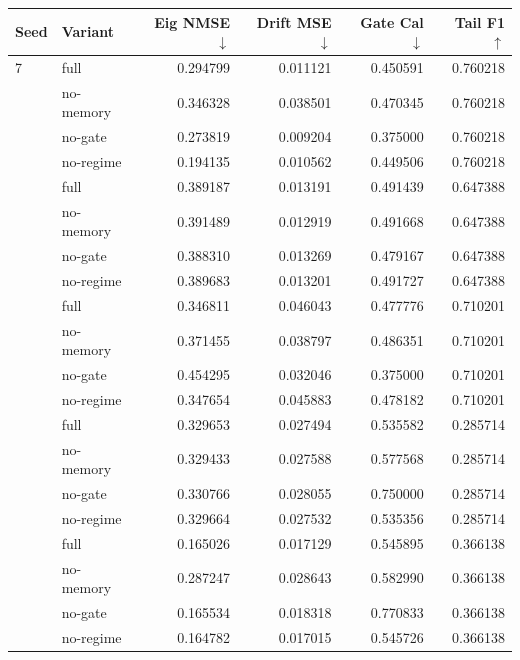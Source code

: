 \begin{tabular}{llrrrr}
\toprule
Seed & Variant & Eig NMSE $\downarrow$ & Drift MSE $\downarrow$ & Gate Cal $\downarrow$ & Tail F1 $\uparrow$ \\
\midrule
7 & full & 0.294799 & 0.011121 & 0.450591 & 0.760218 \\
 & no-memory & 0.346328 & 0.038501 & 0.470345 & 0.760218 \\
 & no-gate & 0.273819 & 0.009204 & 0.375000 & 0.760218 \\
 & no-regime & 0.194135 & 0.010562 & 0.449506 & 0.760218 \\
\addlinespace[2pt]
19 & full & 0.389187 & 0.013191 & 0.491439 & 0.647388 \\
 & no-memory & 0.391489 & 0.012919 & 0.491668 & 0.647388 \\
 & no-gate & 0.388310 & 0.013269 & 0.479167 & 0.647388 \\
 & no-regime & 0.389683 & 0.013201 & 0.491727 & 0.647388 \\
\addlinespace[2pt]
31 & full & 0.346811 & 0.046043 & 0.477776 & 0.710201 \\
 & no-memory & 0.371455 & 0.038797 & 0.486351 & 0.710201 \\
 & no-gate & 0.454295 & 0.032046 & 0.375000 & 0.710201 \\
 & no-regime & 0.347654 & 0.045883 & 0.478182 & 0.710201 \\
\addlinespace[2pt]
43 & full & 0.329653 & 0.027494 & 0.535582 & 0.285714 \\
 & no-memory & 0.329433 & 0.027588 & 0.577568 & 0.285714 \\
 & no-gate & 0.330766 & 0.028055 & 0.750000 & 0.285714 \\
 & no-regime & 0.329664 & 0.027532 & 0.535356 & 0.285714 \\
\addlinespace[2pt]
59 & full & 0.165026 & 0.017129 & 0.545895 & 0.366138 \\
 & no-memory & 0.287247 & 0.028643 & 0.582990 & 0.366138 \\
 & no-gate & 0.165534 & 0.018318 & 0.770833 & 0.366138 \\
 & no-regime & 0.164782 & 0.017015 & 0.545726 & 0.366138 \\
\bottomrule
\end{tabular}
